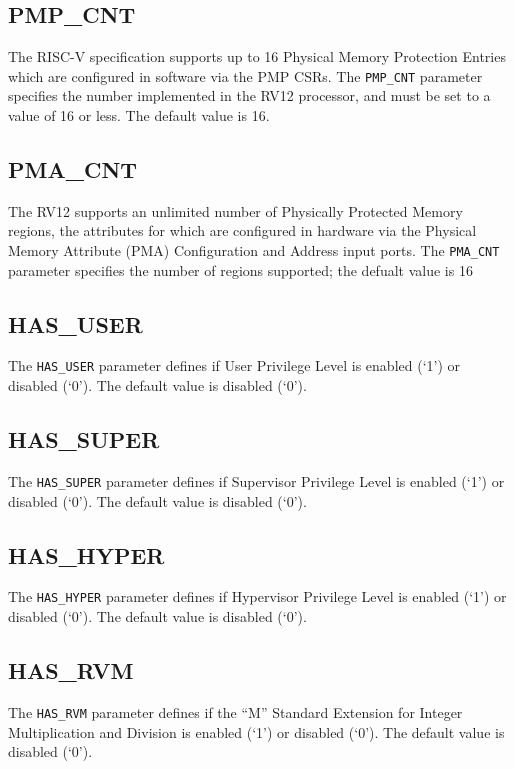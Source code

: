 \subsection{PMP\_CNT}\label{pmp_cnt}
The RISC-V specification supports up to 16 Physical Memory Protection Entries which are configured in software via the PMP CSRs. The \texttt{PMP\_CNT} parameter specifies the number implemented in the RV12 processor, and must be set to a value of 16 or less. The default value is 16.

\subsection{PMA\_CNT}\label{pma_cnt}
The RV12 supports an unlimited number of Physically Protected Memory regions, the attributes for which are configured in hardware via the Physical Memory Attribute (PMA) Configuration and Address input ports. The \texttt{PMA\_CNT} parameter specifies the number of regions supported; the defualt value is 16

\subsection{HAS\_USER}\label{has_user}

The \texttt{HAS\_USER} parameter defines if User Privilege Level is enabled
(`1') or disabled (`0'). The default value is disabled (`0').

\subsection{HAS\_SUPER}\label{has_super}

The \texttt{HAS\_SUPER} parameter defines if Supervisor Privilege Level is
enabled (`1') or disabled (`0'). The default value is disabled (`0').

\subsection{HAS\_HYPER}\label{has_hyper}

The \texttt{HAS\_HYPER} parameter defines if Hypervisor Privilege Level is
enabled (`1') or disabled (`0'). The default value is disabled (`0').

\subsection{HAS\_RVM}\label{has_rvm}

The \texttt{HAS\_RVM} parameter defines if the ``M'' Standard Extension for
Integer Multiplication and Division is enabled (`1') or disabled (`0').
The default value is disabled (`0').

